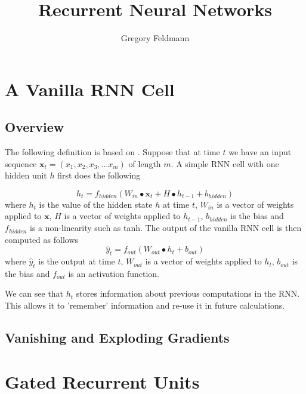 \documentclass[]{article}
\title{Recurrent Neural Networks}
\author{Gregory Feldmann}
\begin{document}
\maketitle

\begin{abstract}

\end{abstract}

\section{A Vanilla RNN Cell}
\subsection{Overview}
The following definition is based on \cite{bullinaria}. Suppose that at time $t$ we have an input sequence $\textbf{x}_{t} = (x_{1}, x_{2}, x_{3},...x_{m})$ of length $m$. A simple RNN cell with one hidden unit $h$ first does the following

\begin{equation}
h_{t} = f_{hidden}(W_{in} \bullet \textbf{x}_{t} + H \bullet h_{t-1} + b_{hidden})
\end{equation}
where $h_{t}$ is the value of the hidden state $h$ at time $t$, $W_{in}$ is a vector of weights applied to $\textbf{x}$, $H$ is a vector of weights applied to $h_{t-1}$, $b_{hidden}$ is the bias and $f_{hidden}$ is a non-linearity such as tanh. The output of the vanilla RNN cell is then computed as follows
\begin{equation}
\hat{y}_{t} = f_{out}(W_{out} \bullet h_{t} + b_{out})
\end{equation}
where $\hat{y}_{t}$ is the output at time $t$, $W_{out}$ is a vector of weights applied to $h_{t}$, $b_{out}$ is the bias and $f_{out}$ is an activation function.

We can see that $h_{t}$ stores information about previous computations in the RNN. This allows it to 'remember' information and re-use it in future calculations.

\subsection{Vanishing and Exploding Gradients}

\section{Gated Recurrent Units}
\end{document}
